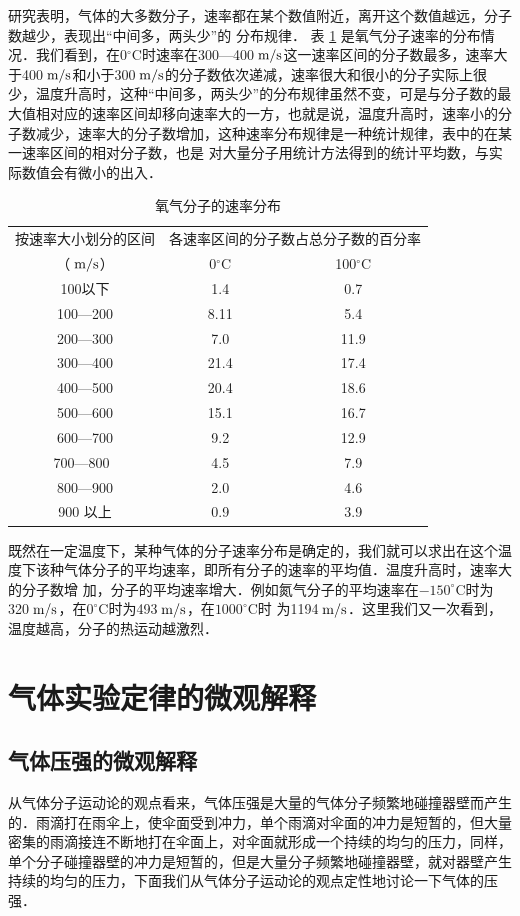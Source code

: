 研究表明，气体的大多数分子，速率都在某个数值附近，离开这个数值越远，分子数越少，表现出“中间多，两头少”的
分布规律．
表 \ref{tab_B_3-1} 是氧气分子速率的分布情况．我们看到，在0$^\circ$C时速率在300—400$\;\text{m}/\text{s}$这一速率区间的分子数最多，速率大于400$\;\text{m}/\text{s}$和小于300$\;\text{m}/\text{s}$的分子数依次递减，速率很大和很小的分子实际上很少，温度升高时，这种“中间多，两头少”的分布规律虽然不变，可是与分子数的最大值相对应的速率区间却移向速率大的一方，也就是说，温度升高时，速率小的分子数减少，速率大的分子数增加，这种速率分布规律是一种统计规律，表中的在某一速率区间的相对分子数，也是
对大量分子用统计方法得到的统计平均数，与实际数值会有微小的出入．

\begin{table}[htbp]
    \centering
    \caption{氧气分子的速率分布}\label{tab_B_3-1}
    \begin{tabular}{ccc}
		\toprule
		按速率大小划分的区间 & \multicolumn{2}{c}{各速率区间的分子数占总分子数的百分率}\\
		（$\;\text{m}/\text{s}$）& 0$^\circ $C & 100$^\circ $C\\
		\midrule
		100以下 & 1.4 & 0.7\\
		100—200 &    8.11 &    5.4
		\\
		200—300 &    7.0     &11.9
		\\
		300—400 &    21.4 &    17.4
		\\
		400—500 &    20.4 &    18.6
		\\
		500—600 &    15.1 &    16.7
		\\
		600—700 &    9.2 &    12.9
		\\
		700—800  &    4.5 &    7.9
		\\
		800—900 &    2.0 &    4.6
		\\
		900 以上 &    0.9 &    3.9\\
		\bottomrule
    \end{tabular}
\end{table}

既然在一定温度下，某种气体的分子速率分布是确定的，我们就可以求出在这个温度下该种气体分子的平均速率，即所有分子的速率的平均值．温度升高时，速率大的分子数增
加，分子的平均速率增大．例如氮气分子的平均速率在$-150^\circ $C时为320$\;\text{m}/\text{s}$，在$0^\circ $C时为493$\;\text{m}/\text{s}$，在$1000^\circ $C时
为1194$\;\text{m}/\text{s}$．这里我们又一次看到，温度越高，分子的热运动越激烈．

\section{气体实验定律的微观解释}
\subsection{气体压强的微观解释} 
从气体分子运动论的观点看来，气体压强是大量的气体分子频繁地碰撞器壁而产生的．雨滴打在雨伞上，使伞面受到冲力，单个雨滴对伞面的冲力是短暂的，但大量密集的雨滴接连不断地打在伞面上，对伞面就形成一个持续的均匀的压力，同样，单个分子碰撞器壁的冲力是短暂的，但是大量分子频繁地碰撞器壁，就对器壁产生持续的均匀的压力，下面我们从气体分子运动论的观点定性地讨论一下气体的压强．

